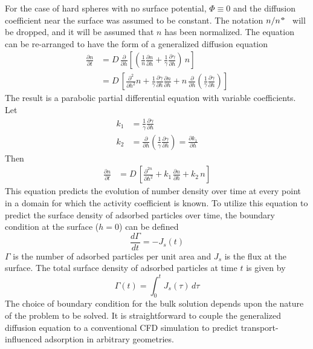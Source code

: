 For the case of hard spheres with no surface potential, $\Phi\equiv0$
and the diffusion coefficient near the surface was assumed to be constant.
The notation \(n  / n^\standardstate\) will be dropped, and it will
be assumed that $n$ has been normalized. The equation can be re-arranged
to have the form of a generalized diffusion equation\begin{align}
\frac{\partial n}{\partial t} & =D\,\frac{\partial}{\partial h}\left[\left(\frac{1}{n}\frac{\partial n}{\partial h}+\frac{1}{\gamma}\frac{\partial\gamma}{\partial h}\right)\, n\right]\nonumber \\
 & =D\,\left[\frac{\partial^{2}}{\partial h^{2}}n+\frac{1}{\gamma}\frac{\partial\gamma}{\partial h}\frac{\partial n}{\partial h}+n\,\frac{\partial}{\partial h}\left(\frac{1}{\gamma}\frac{\partial\gamma}{\partial h}\right)\right]\label{eq:Generalized Diffusion Eqn}\end{align}
The result is a parabolic partial differential equation with variable
coefficients. Let\begin{align}
k_{1} & =\frac{1}{\gamma}\frac{\partial\gamma}{\partial h}\nonumber \\
k_{2} & =\frac{\partial}{\partial h}\left(\frac{1}{\gamma}\frac{\partial\gamma}{\partial h}\right)=\frac{\partial k_{1}}{\partial h}\label{eq:Variable coefficients}\end{align}
Then\begin{align}
\frac{\partial n}{\partial t} & =D\,\left[\frac{\partial^{2n}}{\partial h^{2}}+k_{1\,}\frac{\partial n}{\partial h}+k_{2}\, n\right]\label{eq:Generalized Diffusion Eqn 1D}\end{align}
 This equation predicts the evolution of number density over time
at every point in a domain for which the activity coefficient is known.
To utilize this equation to predict the surface density of adsorbed
particles over time, the boundary condition at the surface ($h=0$)
can be defined\begin{equation}
\frac{d\Gamma}{dt}=-J_{s}\left(t\right)\label{eq:Flux matching BC}\end{equation}
$\Gamma$ is the number of adsorbed particles per unit area and $J_{s}$
is the flux at the surface. The total surface density of adsorbed
particles at time $t$ is given by\begin{equation}
\Gamma\left(t\right)=\int_{0}^{t}J_{s}\left(\tau\right)\, d\tau\label{eq:Total surface density}\end{equation}
The choice of boundary condition for the bulk solution depends upon
the nature of the problem to be solved. It is straightforward to couple
the generalized diffusion equation to a conventional CFD simulation
to predict transport-influenced adsorption in arbitrary geometries. 


